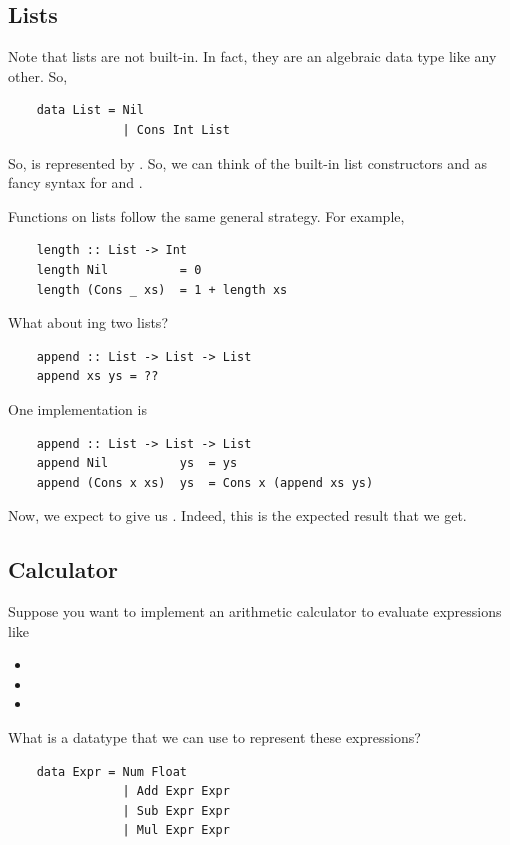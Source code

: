 \documentclass[letterpaper]{article}
\begin{document}
\subsection{Lists}
Note that lists are not built-in. In fact, they are an algebraic data type like any other. So,
\begin{verbatim}
    data List = Nil 
                | Cons Int List 
\end{verbatim}
So, \code{[1, 2, 3]} is represented by . So, we can think of the built-in list constructors \code{[]} and \code{(:)} as fancy syntax for  and .

\bigskip 

Functions on lists follow the same general strategy. For example, 
\begin{verbatim}
    length :: List -> Int 
    length Nil          = 0
    length (Cons _ xs)  = 1 + length xs \end{verbatim}

What about ing two lists? 
\begin{verbatim}
    append :: List -> List -> List 
    append xs ys = ??\end{verbatim}
One implementation is 
\begin{verbatim}
    append :: List -> List -> List 
    append Nil          ys  = ys 
    append (Cons x xs)  ys  = Cons x (append xs ys)\end{verbatim}
Now, we expect  to give us \code{[1, 2, 3, 4]}. Indeed, this is the expected result that we get.

\subsection{Calculator}
Suppose you want to implement an arithmetic calculator to evaluate expressions like 
\begin{itemize}
    \item {}
    \item {}
    \item {}
\end{itemize}
What is a datatype that we can use to represent these expressions? 
\begin{verbatim}
    data Expr = Num Float 
                | Add Expr Expr 
                | Sub Expr Expr 
                | Mul Expr Expr\end{verbatim}
\end{document}
